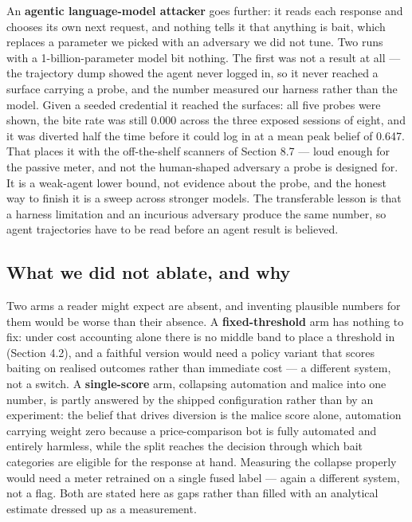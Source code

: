 An \textbf{agentic language-model attacker} goes further: it reads each response and
chooses its own next request, and nothing tells it that anything is bait, which
replaces a parameter we picked with an adversary we did not tune. Two runs with a
1-billion-parameter model bit nothing. The first was not a result at all --- the
trajectory dump showed the agent never logged in, so it never reached a surface
carrying a probe, and the number measured our harness rather than the model. Given
a seeded credential it reached the surfaces: all five probes were shown, the bite
rate was still 0.000 across the three exposed sessions of eight, and it was diverted
half the time before it could log in at a mean peak belief of 0.647. That places it
with the off-the-shelf scanners of Section 8.7 --- loud enough for the passive meter,
and not the human-shaped adversary a probe is designed for. It is a weak-agent lower
bound, not evidence about the probe, and the honest way to finish it is a sweep
across stronger models. The transferable lesson is that a harness limitation and an
incurious adversary produce the same number, so agent trajectories have to be read
before an agent result is believed.


\subsection{What we did not ablate, and why}

Two arms a reader might expect are absent, and inventing plausible numbers for them
would be worse than their absence. A \textbf{fixed-threshold} arm has nothing to fix:
under cost accounting alone there is no middle band to place a threshold in
(Section 4.2), and a faithful version would need a policy variant that scores
baiting on realised outcomes rather than immediate cost --- a different system, not a
switch. A \textbf{single-score} arm, collapsing automation and malice into one number,
is partly answered by the shipped configuration rather than by an experiment: the
belief that drives diversion is the malice score alone, automation carrying weight
zero because a price-comparison bot is fully automated and entirely harmless, while
the split reaches the decision through which bait categories are eligible for the
response at hand. Measuring the collapse properly would need a meter retrained on a
single fused label --- again a different system, not a flag. Both are stated here as
gaps rather than filled with an analytical estimate dressed up as a measurement.
